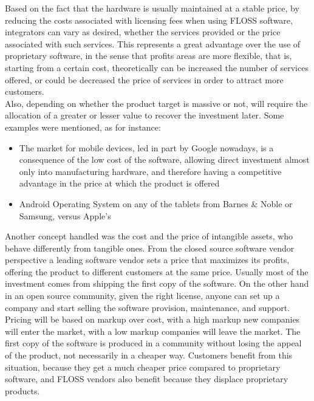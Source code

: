 Based on the fact that the hardware is usually maintained at a stable price, by reducing the costs associated with licensing fees when using FLOSS software, integrators can vary as desired, whether the services provided or the price associated with such services. This represents a great advantage over the use of proprietary software, in the sense that profits areas are more flexible, that is, starting from a certain cost, theoretically can be increased the number of services offered, or could be decreased the price of services in order to attract more customers.\\

Also, depending on whether the product target is massive or not, will require the allocation of a greater or lesser value to recover the investment later. Some examples were mentioned, as for instance:

\begin{itemize}
\item The market for mobile devices, led in part by Google nowadays, is a consequence of the low cost of the software, allowing direct investment almost only into manufacturing hardware, and therefore having a competitive advantage in the price at which the product is offered
\item Android Operating System on any of the tablets from Barnes \& Noble or Samsung, versus Apple's
\end{itemize}

Another concept handled was the cost and the price of intangible assets, who behave differently from tangible ones. From the closed source software vendor perspective a leading software vendor sets a price that maximizes its profits, offering the product to different customers at the same price. Usually most of the investment comes from shipping the first copy of the software. On the other hand in an open source community, given the right license, anyone can set up a company and start selling the software provision, maintenance, and support. Pricing will be based on markup over cost, with a high markup new companies will enter the market, with a low markup companies will leave the market. The first copy of the software is produced in a community without losing the appeal of the product, not necessarily in a cheaper way. Customers benefit from this situation, because they get a much cheaper price compared to proprietary software, and FLOSS vendors also benefit because they displace proprietary products.\\

